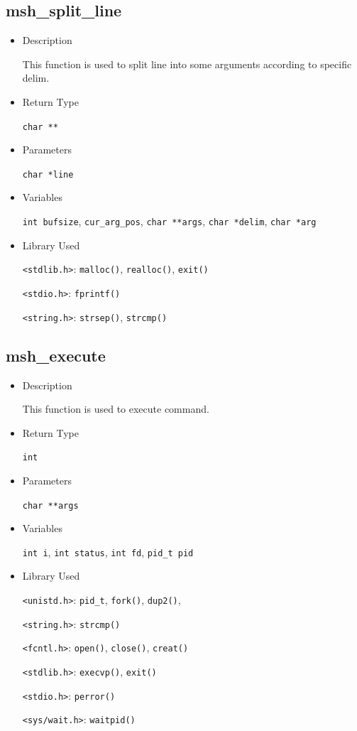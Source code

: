 \documentclass{article}
\begin{document}
\subsection{msh\_split\_line}
\begin{itemize}
\item Description

This function is used to split line into some arguments according to specific delim.

\item Return Type

\verb|char **|

\item Parameters

\verb|char *line|

\item Variables

\verb|int bufsize|, \verb|cur_arg_pos|, \verb|char **args|, \verb|char *delim|, \verb|char *arg|

\item Library Used

\verb|<stdlib.h>|: \verb|malloc()|, \verb|realloc()|, \verb|exit()|

\verb|<stdio.h>|: \verb|fprintf()|

\verb|<string.h>|: \verb|strsep()|, \verb|strcmp()|
\end{itemize}

\subsection{msh\_execute}
\begin{itemize}
\item Description

This function is used to execute command.

\item Return Type

\verb|int|

\item Parameters

\verb|char **args|

\item Variables

\verb|int i|, \verb|int status|, \verb|int fd|, \verb|pid_t pid|

\item Library Used

\verb|<unistd.h>|: \verb|pid_t|, \verb|fork()|, \verb|dup2()|,

\verb|<string.h>|: \verb|strcmp()|

\verb|<fcntl.h>|: \verb|open()|, \verb|close()|, \verb|creat()|

\verb|<stdlib.h>|: \verb|execvp()|, \verb|exit()|

\verb|<stdio.h>|: \verb|perror()|

\verb|<sys/wait.h>|: \verb|waitpid()|
\end{itemize}
\end{document}
